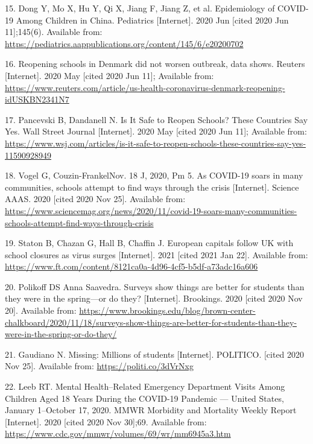 \documentclass[
]{article}
\begin{document}
\leavevmode\hypertarget{ref-dong_epidemiology_2020}{}%
15. Dong Y, Mo X, Hu Y, Qi X, Jiang F, Jiang Z, et al. Epidemiology of
COVID-19 Among Children in China. Pediatrics {[}Internet{]}. 2020 Jun
{[}cited 2020 Jun 11{]};145(6). Available from:
\url{https://pediatrics.aappublications.org/content/145/6/e20200702}

\leavevmode\hypertarget{ref-noauthor_reopening_2020}{}%
16. Reopening schools in Denmark did not worsen outbreak, data shows.
Reuters {[}Internet{]}. 2020 May {[}cited 2020 Jun 11{]}; Available
from:
\url{https://www.reuters.com/article/us-health-coronavirus-denmark-reopening-idUSKBN2341N7}

\leavevmode\hypertarget{ref-pancevski_is_2020}{}%
17. Pancevski B, Dandanell N. Is It Safe to Reopen Schools? These
Countries Say Yes. Wall Street Journal {[}Internet{]}. 2020 May {[}cited
2020 Jun 11{]}; Available from:
\url{https://www.wsj.com/articles/is-it-safe-to-reopen-schools-these-countries-say-yes-11590928949}

\leavevmode\hypertarget{ref-vogel_as_2020}{}%
18. Vogel G, Couzin-FrankelNov. 18 J, 2020, Pm 5. As COVID-19 soars in
many communities, schools attempt to find ways through the crisis
{[}Internet{]}. Science AAAS. 2020 {[}cited 2020 Nov 25{]}. Available
from:
\url{https://www.sciencemag.org/news/2020/11/covid-19-soars-many-communities-schools-attempt-find-ways-through-crisis}

\leavevmode\hypertarget{ref-staton_european_2021}{}%
19. Staton B, Chazan G, Hall B, Chaffin J. European capitals follow UK
with school closures as virus surges {[}Internet{]}. 2021 {[}cited 2021
Jan 22{]}. Available from:
\url{https://www.ft.com/content/8121ca0a-4d96-4cf5-b5df-a73adc16a606}

\leavevmode\hypertarget{ref-polikoff_surveys_2020}{}%
20. Polikoff DS Anna Saavedra. Surveys show things are better for
students than they were in the spring---or do they? {[}Internet{]}.
Brookings. 2020 {[}cited 2020 Nov 20{]}. Available from:
\url{https://www.brookings.edu/blog/brown-center-chalkboard/2020/11/18/surveys-show-things-are-better-for-students-than-they-were-in-the-spring-or-do-they/}

\leavevmode\hypertarget{ref-gaudiano_missing_nodate}{}%
21. Gaudiano N. Missing: Millions of students {[}Internet{]}. POLITICO.
{[}cited 2020 Nov 25{]}. Available from: \url{https://politi.co/3dVrNxg}

\leavevmode\hypertarget{ref-leeb_mental_2020}{}%
22. Leeb RT. Mental Health--Related Emergency Department Visits Among
Children Aged 18 Years During the COVID-19 Pandemic --- United States,
January 1--October 17, 2020. MMWR Morbidity and Mortality Weekly Report
{[}Internet{]}. 2020 {[}cited 2020 Nov 30{]};69. Available from:
\url{https://www.cdc.gov/mmwr/volumes/69/wr/mm6945a3.htm}
\end{document}
